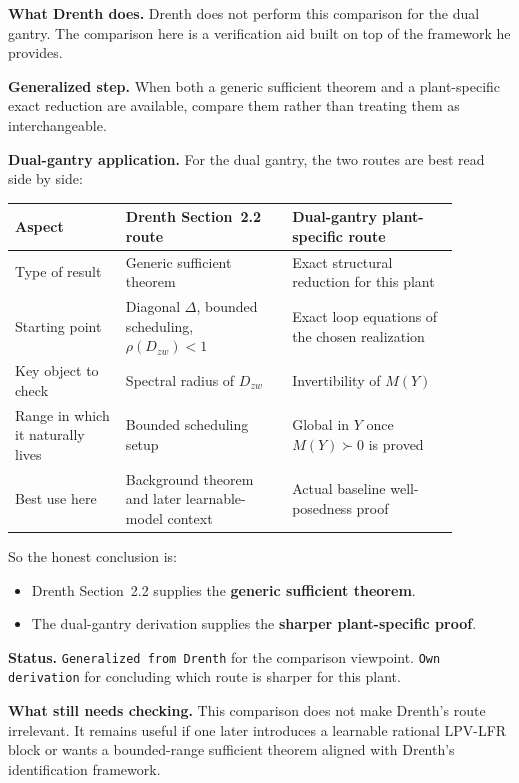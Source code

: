 \documentclass[11pt]{article}
\newcommand{\audititem}[2]{\par\smallskip\noindent\textbf{#1.} #2\par}
\newcommand{\statusline}[1]{\texttt{#1}}
\begin{document}
\audititem{What Drenth does}{Drenth does not perform this comparison for the
dual gantry. The comparison here is a verification aid built on top of the
framework he provides.}

\audititem{Generalized step}{When both a generic sufficient theorem and a
plant-specific exact reduction are available, compare them rather than treating
them as interchangeable.}

\audititem{Dual-gantry application}{For the dual gantry, the two routes are best
read side by side:
\begin{center}
\begin{tabular}{p{0.22\linewidth}p{0.33\linewidth}p{0.33\linewidth}}
\toprule
Aspect & Drenth Section~2.2 route & Dual-gantry plant-specific route \\
\midrule
Type of result & Generic sufficient theorem & Exact structural reduction for this plant \\
Starting point & Diagonal $\Delta$, bounded scheduling, $\rho(D_{zw})<1$ & Exact loop equations of the chosen realization \\
Key object to check & Spectral radius of $D_{zw}$ & Invertibility of $M(Y)$ \\
Range in which it naturally lives & Bounded scheduling setup & Global in $Y$ once $M(Y)\succ 0$ is proved \\
Best use here & Background theorem and later learnable-model context & Actual baseline well-posedness proof \\
\bottomrule
\end{tabular}
\end{center}
So the honest conclusion is:
\begin{itemize}[leftmargin=1.2em]
    \item Drenth Section~2.2 supplies the \textbf{generic sufficient theorem}.
    \item The dual-gantry derivation supplies the \textbf{sharper plant-specific
    proof}.
\end{itemize}}

\audititem{Status}{\statusline{Generalized from Drenth} for the comparison
viewpoint. \statusline{Own derivation} for concluding which route is sharper for
this plant.}

\audititem{What still needs checking}{This comparison does not make Drenth's
route irrelevant. It remains useful if one later introduces a learnable rational
LPV-LFR block or wants a bounded-range sufficient theorem aligned with Drenth's
identification framework.}
\end{document}
